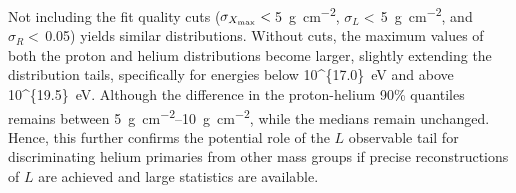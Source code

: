 Not including the fit quality cuts ($\sigma_{X_{\rm max}}<\,$\qty{5}{\gram\per\centi\meter\squared}, $\sigma_{L}<\,$\qty{5}{\gram\per\centi\meter\squared}, and $\sigma_{R}<\,$0.05) yields similar distributions.
Without cuts, the maximum values of both the proton and helium distributions become larger, slightly extending the distribution tails, specifically for energies below \qty[parse-numbers=false]{10^{17.0}}{\electronvolt} and above \qty[parse-numbers=false]{10^{19.5}}{\electronvolt}.
Although the difference in the proton-helium 90\% quantiles remains between \qtyrange{5}{10}{\gram\per\centi\meter\squared}, while the medians remain unchanged.
Hence, this further confirms the potential role of the $L$ observable tail for discriminating helium primaries from other mass groups if precise reconstructions of $L$ are achieved and large statistics are available.







